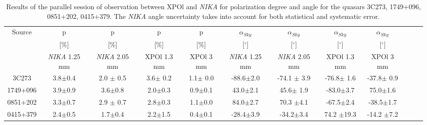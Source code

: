 \documentclass[twocolumn,traditabstract]{aa}
\begin{document}
\begin{table}
\begin{center}
\begin{tabular}{cccccccccccc}
\hline
\hline
Source & p  & p  & p  & p  & $\alpha_{Sky}$ & $\alpha_{Sky}$ & $\alpha_{Sky}$  & $\alpha_{Sky}$\\
 & [$\%$] & [$\%$] & [$\%$] & [$\%$] & [$^\circ$] &[$^\circ$] &[$^\circ$]&[$^\circ$] \\
 & {\it NIKA} 1.25 mm & {\it NIKA} 2.05 mm & XPOl 1.3 mm & XPOl 3 mm & {\it NIKA} 1.25 mm  & {\it NIKA} 2.05 mm & XPOl 1.3 mm & XPOl 3 mm \\
 
\hline
3C273 & 3.8$\pm$0.4       & 2.0 $\pm$ 0.5 & 3.6$\pm$ 0.2  & 1.1$\pm$ 0.0 & -88.6$\pm$2.0 & -74.1 $\pm$ 3.9  & -76.8$\pm$ 1.6 & -37.8$\pm$ 0.9\\
1749+096 & 3.9$\pm$0.9 & 3.6$\pm$0.8 & 2.0$\pm$0.3      & 0.9$\pm$0.1 &  43.0$\pm$2.1 & 45.6$\pm$ 1.9 & -83.0$\pm$3.7 & 75.0$\pm$1.6 \\
0851+202 & 3.3$\pm$0.7 & 2.9 $\pm$ 0.7 & 2.8$\pm$0.3    & 1.1$\pm$0.0 & 84.0$\pm$2.7 & 70.3 $\pm$4.1 & -67.5$\pm$2.4  & -38.5$\pm$1.7 \\
0415+379 & 2.4$\pm$0.5 & 1.7$\pm$0.4 & 2.2$\pm$1.5     & 0.4$\pm$0.1 & -28.4$\pm$3.9  & -34.2$\pm$3.4 & 74.2 $\pm$19.3  & -14.2 $\pm$7.2\\
\hline
\end{tabular}
\caption{ Results of the parallel session of observation between XPOl and {\it NIKA} for polarization degree and angle for the quasars 3C273, 1749+096, 0851+202, 0415+379. The {\it NIKA} angle uncertainty takes into account for both statistical and systematic error.}
\label{tab:calib_degree}
\end{center}


\end{table}
\end{document}
